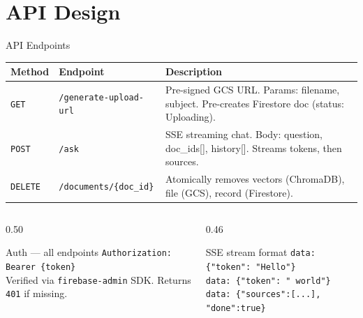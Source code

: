 \documentclass[aspectratio=169]{beamer}
\begin{document}
\section{API Design}

\begin{frame}[t,shrink=3]{API Endpoints}
  \footnotesize
  \renewcommand{\arraystretch}{1.4}
  \begin{tabularx}{\textwidth}{@{}llX@{}}
    \toprule
    \textbf{Method} & \textbf{Endpoint} & \textbf{Description} \\
    \midrule
    \texttt{GET}    & \texttt{/generate-upload-url} &
      Pre-signed GCS URL. Params: filename, subject.
      Pre-creates Firestore doc (status: Uploading). \\
    \texttt{POST}   & \texttt{/ask} &
      SSE streaming chat. Body: question, doc\_ids[], history[].
      Streams tokens, then sources. \\
    \texttt{DELETE} & \texttt{/documents/\{doc\_id\}} &
      Atomically removes vectors (ChromaDB), file (GCS), record (Firestore). \\
    \bottomrule
  \end{tabularx}

  \vspace{0.3cm}
  \begin{columns}[t]
    \begin{column}{0.50\textwidth}
      \begin{block}{Auth — all endpoints}
        {\footnotesize \texttt{Authorization: Bearer \{token\}}\\
        Verified via \texttt{firebase-admin} SDK.
        Returns \texttt{401} if missing.}
      \end{block}
    \end{column}
    \begin{column}{0.46\textwidth}
      \begin{block}{SSE stream format}
        {\footnotesize
        \texttt{data: \{"token": "Hello"\}}\\
        \texttt{data: \{"token": " world"\}}\\
        \texttt{data: \{"sources":[...], "done":true\}}}
      \end{block}
    \end{column}
  \end{columns}
\end{frame}

\end{document}
